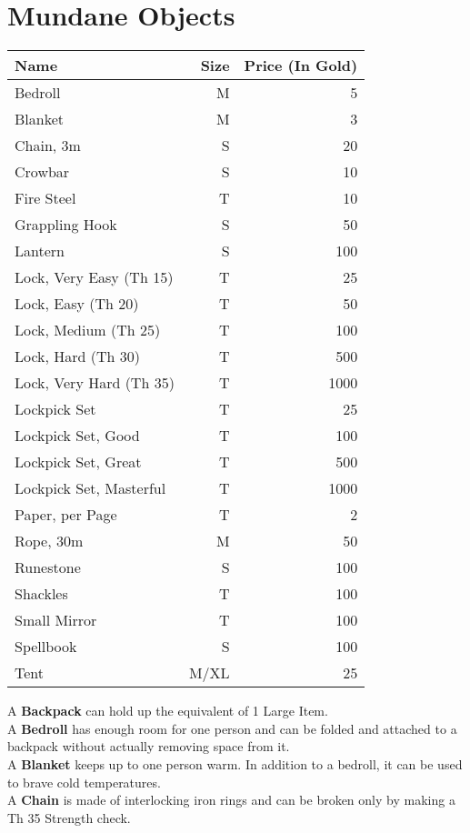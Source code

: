 \section{Mundane Objects}\label{sec:mundaneObjects}
\begin{longtable}{l | r | r}
	Name & Size & Price (In Gold)\\ \hline
	Bedroll & M & 5\\
	Blanket & M & 3\\
	Chain, 3m & S & 20\\
	Crowbar & S & 10\\
	Fire Steel & T & 10\\
	Grappling Hook & S & 50\\
	Lantern & S & 100\\
	Lock, Very Easy (Th 15) & T & 25\\
	Lock, Easy (Th 20) & T & 50\\
	Lock, Medium (Th 25) & T & 100\\
	Lock, Hard (Th 30) & T & 500\\
	Lock, Very Hard (Th 35) & T & 1000\\
	Lockpick Set & T & 25\\
	Lockpick Set, Good & T & 100\\
	Lockpick Set, Great & T & 500\\
	Lockpick Set, Masterful & T & 1000\\
	Paper, per Page & T & 2\\
	Rope, 30m & M & 50\\
	Runestone & S & 100\\
	Shackles & T & 100\\
	Small Mirror & T & 100\\
	Spellbook & S & 100\\
	Tent & M/XL & 25\\
\end{longtable}

A \textbf{Backpack} can hold up the equivalent of 1 Large Item.\\

A \textbf{Bedroll} has enough room for one person and can be folded and attached to a backpack without actually removing space from it.\\

A \textbf{Blanket} keeps up to one person warm.
In addition to a bedroll, it can be used to brave cold temperatures.\\

A \textbf{Chain} is made of interlocking iron rings and can be broken only by making a Th 35 Strength check.\\

